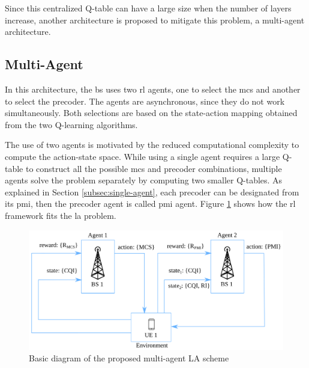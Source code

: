 Since this centralized Q-table can have a large size when the number of layers increase, another architecture is proposed to mitigate this problem, a multi-agent architecture.

\subsection{Multi-Agent}

In this architecture, the \gls{bs} uses two \gls{rl} agents, one to select the \gls{mcs} and another to select the precoder.
%
The agents are asynchronous, since they do not work simultaneously.
%
Both selections are based on the state-action mapping obtained from the two Q-learning algorithms.


The use of two agents is motivated by the reduced computational complexity to compute the action-state space.
%
While using a single agent requires a large Q-table to construct all the possible \gls{mcs} and precoder combinations, multiple agents solve the problem separately by computing two smaller Q-tables.
%
As explained in Section \ref{subsec:single-agent}, each precoder can be designated from its \gls{pmi}, then the precoder agent is called \gls{pmi} agent.
%
Figure \ref{fig:la-rl-frame} shows how the \gls{rl} framework fits the \gls{la} problem.

%
\begin{figure}[!hb]
	\centerline{\includegraphics[width=\columnwidth]{figures/chp_la/rl-framework-mateus.png}}
	\caption{Basic diagram of the proposed multi-agent LA scheme}
	\label{fig:la-rl-frame}
\end{figure}
%


